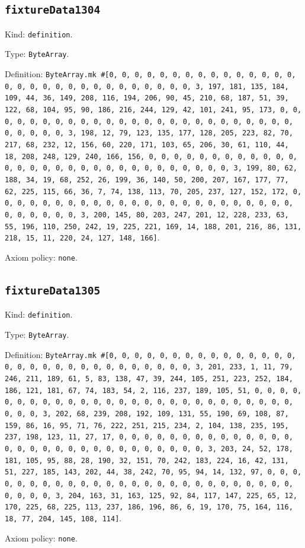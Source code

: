 \documentclass[11pt]{article}
\begin{document}
\subsection*{\texttt{fixtureData1304}}
\noindent Kind: \texttt{definition}.\par
\noindent Type: \texttt{ByteArray}.\par
\noindent Definition: \texttt{ByteArray.mk \#[0, 0, 0, 0, 0, 0, 0, 0, 0, 0, 0, 0, 0, 0, 0, 0, 0, 0, 0, 0, 0, 0, 0, 0, 0, 0, 0, 0, 0, 0, 3, 197, 181, 135, 184, 109, 44, 36, 149, 208, 116, 194, 206, 90, 45, 210, 68, 187, 51, 39, 122, 68, 104, 95, 90, 186, 216, 244, 129, 42, 101, 241, 95, 173, 0, 0, 0, 0, 0, 0, 0, 0, 0, 0, 0, 0, 0, 0, 0, 0, 0, 0, 0, 0, 0, 0, 0, 0, 0, 0, 0, 0, 0, 0, 3, 198, 12, 79, 123, 135, 177, 128, 205, 223, 82, 70, 217, 68, 232, 12, 156, 60, 220, 171, 103, 65, 206, 30, 61, 110, 44, 18, 208, 248, 129, 240, 166, 156, 0, 0, 0, 0, 0, 0, 0, 0, 0, 0, 0, 0, 0, 0, 0, 0, 0, 0, 0, 0, 0, 0, 0, 0, 0, 0, 0, 0, 0, 0, 3, 199, 80, 62, 188, 34, 19, 68, 252, 26, 199, 36, 140, 50, 200, 207, 167, 177, 77, 62, 225, 115, 66, 36, 7, 74, 138, 113, 70, 205, 237, 127, 152, 172, 0, 0, 0, 0, 0, 0, 0, 0, 0, 0, 0, 0, 0, 0, 0, 0, 0, 0, 0, 0, 0, 0, 0, 0, 0, 0, 0, 0, 0, 0, 3, 200, 145, 80, 203, 247, 201, 12, 228, 233, 63, 55, 196, 110, 250, 242, 19, 225, 221, 169, 14, 188, 201, 216, 86, 131, 218, 15, 11, 220, 24, 127, 148, 166]}.\par
\noindent Axiom policy: \texttt{none}.\par
\subsection*{\texttt{fixtureData1305}}
\noindent Kind: \texttt{definition}.\par
\noindent Type: \texttt{ByteArray}.\par
\noindent Definition: \texttt{ByteArray.mk \#[0, 0, 0, 0, 0, 0, 0, 0, 0, 0, 0, 0, 0, 0, 0, 0, 0, 0, 0, 0, 0, 0, 0, 0, 0, 0, 0, 0, 0, 0, 3, 201, 233, 1, 11, 79, 246, 211, 189, 61, 5, 83, 138, 47, 39, 244, 105, 251, 223, 252, 184, 186, 121, 181, 67, 74, 183, 54, 2, 116, 237, 189, 105, 51, 0, 0, 0, 0, 0, 0, 0, 0, 0, 0, 0, 0, 0, 0, 0, 0, 0, 0, 0, 0, 0, 0, 0, 0, 0, 0, 0, 0, 0, 0, 3, 202, 68, 239, 208, 192, 109, 131, 55, 190, 69, 108, 87, 159, 86, 16, 95, 71, 76, 222, 251, 215, 234, 2, 104, 138, 235, 195, 237, 198, 123, 11, 27, 17, 0, 0, 0, 0, 0, 0, 0, 0, 0, 0, 0, 0, 0, 0, 0, 0, 0, 0, 0, 0, 0, 0, 0, 0, 0, 0, 0, 0, 0, 0, 3, 203, 24, 52, 178, 181, 105, 95, 88, 28, 190, 32, 151, 70, 242, 183, 224, 16, 42, 131, 51, 227, 185, 143, 202, 44, 38, 242, 70, 95, 94, 14, 132, 97, 0, 0, 0, 0, 0, 0, 0, 0, 0, 0, 0, 0, 0, 0, 0, 0, 0, 0, 0, 0, 0, 0, 0, 0, 0, 0, 0, 0, 0, 0, 3, 204, 163, 31, 163, 125, 92, 84, 117, 147, 225, 65, 12, 170, 225, 68, 225, 113, 237, 186, 196, 86, 6, 19, 170, 75, 164, 116, 18, 77, 204, 145, 108, 114]}.\par
\noindent Axiom policy: \texttt{none}.\par
\end{document}

